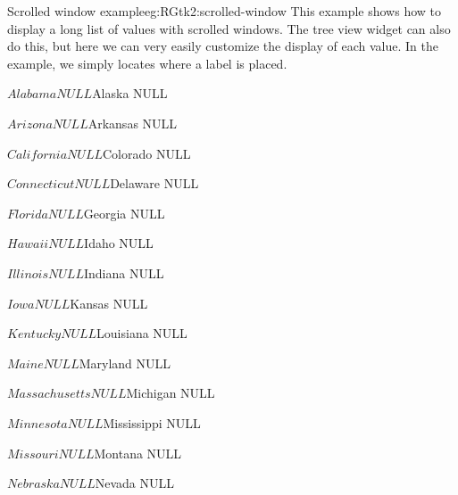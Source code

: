 \begin{example}{Scrolled window example}{eg:RGtk2:scrolled-window}
This example shows how to display a long list of values with scrolled
windows. The tree view widget can also do this, but here we can very
easily customize the display of each value. In the example, we simply
locates where a label is placed.



\begin{Schunk}
\begin{Soutput}
$Alabama
NULL

$Alaska
NULL

$Arizona
NULL

$Arkansas
NULL

$California
NULL

$Colorado
NULL

$Connecticut
NULL

$Delaware
NULL

$Florida
NULL

$Georgia
NULL

$Hawaii
NULL

$Idaho
NULL

$Illinois
NULL

$Indiana
NULL

$Iowa
NULL

$Kansas
NULL

$Kentucky
NULL

$Louisiana
NULL

$Maine
NULL

$Maryland
NULL

$Massachusetts
NULL

$Michigan
NULL

$Minnesota
NULL

$Mississippi
NULL

$Missouri
NULL

$Montana
NULL

$Nebraska
NULL

$Nevada
NULL


\end{Soutput}
\end{Schunk}
\end{example}
